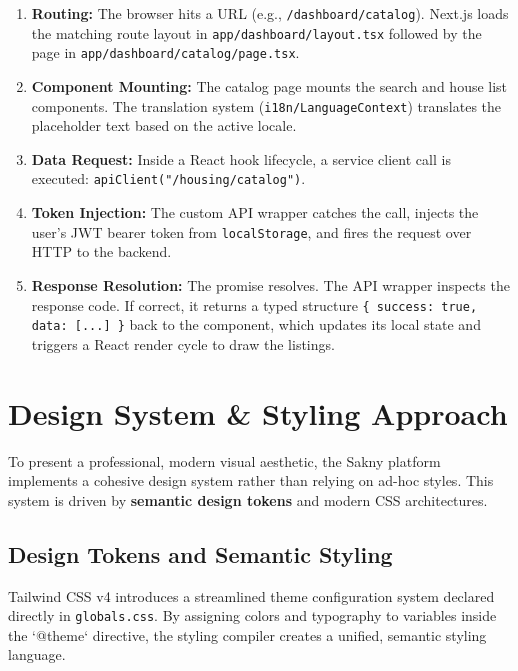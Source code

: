 \documentclass[12pt,a4paper]{article}
\begin{document}
\begin{enumerate}
    \item \textbf{Routing:} The browser hits a URL (e.g., \texttt{/dashboard/catalog}). Next.js loads the matching route layout in \texttt{app/dashboard/layout.tsx} followed by the page in \texttt{app/dashboard/catalog/page.tsx}.
    \item \textbf{Component Mounting:} The catalog page mounts the search and house list components. The translation system (\texttt{i18n/LanguageContext}) translates the placeholder text based on the active locale.
    \item \textbf{Data Request:} Inside a React hook lifecycle, a service client call is executed: \texttt{apiClient("/housing/catalog")}.
    \item \textbf{Token Injection:} The custom API wrapper catches the call, injects the user's JWT bearer token from \texttt{localStorage}, and fires the request over HTTP to the backend.
    \item \textbf{Response Resolution:} The promise resolves. The API wrapper inspects the response code. If correct, it returns a typed structure \texttt{\{ success: true, data: [...] \}} back to the component, which updates its local state and triggers a React render cycle to draw the listings.
\end{enumerate}

\section{Design System \& Styling Approach}

To present a professional, modern visual aesthetic, the Sakny platform implements a cohesive design system rather than relying on ad-hoc styles. This system is driven by \textbf{semantic design tokens} and modern CSS architectures.

\subsection{Design Tokens and Semantic Styling}

Tailwind CSS v4 introduces a streamlined theme configuration system declared directly in \texttt{globals.css}. By assigning colors and typography to variables inside the `@theme` directive, the styling compiler creates a unified, semantic styling language.
\end{document}
